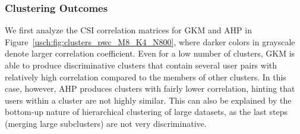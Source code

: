 \subsubsection{Clustering Outcomes}
We first analyze the CSI correlation matrices for GKM and AHP in Figure~\ref{usch:fig:clusters_pwc_M8_K4_N800}, where darker colors in
grayscale denote larger correlation coefficient. Even for a low number of clusters, GKM is able to produce discriminative clusters that contain several user pairs with relatively high correlation compared to the members of other clusters. In this case, however, AHP produces clusters with fairly lower correlation, hinting that users within a cluster are not highly similar. This can also be explained by the bottom-up nature of hierarchical clustering of large datasets, as the last steps (merging large subclusters) are not very discriminative.
